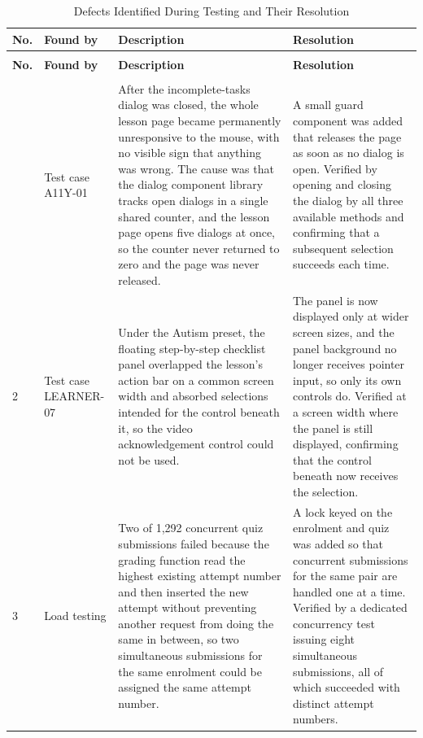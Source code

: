 \documentclass[12pt, oneside]{article} %
\newcommand{\tabbreak}{\hyphenpenalty=200\exhyphenpenalty=200\tolerance=4000\hbadness=10000\hspace{0pt}}
\begin{document}
{
\renewcommand{\arraystretch}{1.25}
\footnotesize
\begin{longtable}{|>{\raggedright\arraybackslash\tabbreak}p{0.8cm}|>{\raggedright\arraybackslash\tabbreak}p{2.2cm}|>{\raggedright\arraybackslash\tabbreak}p{4.5cm}|>{\raggedright\arraybackslash\tabbreak}p{5.65cm}|}
\caption{Defects Identified During Testing and Their Resolution}
\label{tab:defects}\\
\hline
\textbf{No.} & \textbf{Found by} & \textbf{Description} & \textbf{Resolution} \\
\hline \hline
\endfirsthead
\multicolumn{4}{l}{\footnotesize\itshape Table~\ref{tab:defects} continued from the previous page}\\
\hline
\textbf{No.} & \textbf{Found by} & \textbf{Description} & \textbf{Resolution} \\
\hline \hline
\endhead
\hline
\multicolumn{4}{r}{\footnotesize\itshape continued on the next page}\\
\endfoot
\endlastfoot
1 & Test case A11Y-01 & After the incomplete-tasks dialog was closed, the whole lesson page became permanently unresponsive to the mouse, with no visible sign that anything was wrong. The cause was that the dialog component library tracks open dialogs in a single shared counter, and the lesson page opens five dialogs at once, so the counter never returned to zero and the page was never released. & A small guard component was added that releases the page as soon as no dialog is open. Verified by opening and closing the dialog by all three available methods and confirming that a subsequent selection succeeds each time. \\ \hline
2 & Test case LEARNER-07 & Under the Autism preset, the floating step-by-step checklist panel overlapped the lesson's action bar on a common screen width and absorbed selections intended for the control beneath it, so the video acknowledgement control could not be used. & The panel is now displayed only at wider screen sizes, and the panel background no longer receives pointer input, so only its own controls do. Verified at a screen width where the panel is still displayed, confirming that the control beneath now receives the selection. \\ \hline
3 & Load testing & Two of 1,292 concurrent quiz submissions failed because the grading function read the highest existing attempt number and then inserted the new attempt without preventing another request from doing the same in between, so two simultaneous submissions for the same enrolment could be assigned the same attempt number. & A lock keyed on the enrolment and quiz was added so that concurrent submissions for the same pair are handled one at a time. Verified by a dedicated concurrency test issuing eight simultaneous submissions, all of which succeeded with distinct attempt numbers. \\ \hline

\end{longtable}}
\end{document}
